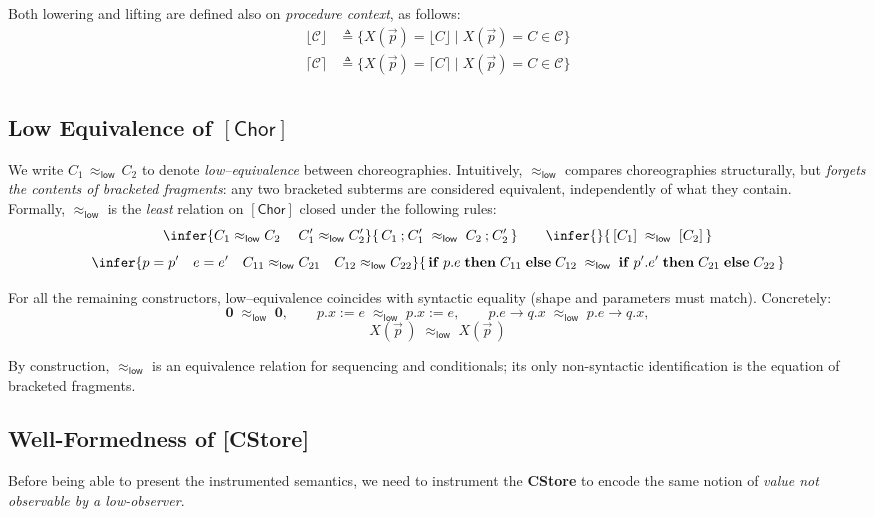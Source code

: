 \documentclass[12pt,a4paper,twoside]{book}
\begin{document}
Both lowering and lifting are defined also on \emph{procedure context}, as follows:
\begin{align*}
	\lfloor \mathscr{C} \rfloor &\triangleq
\{X(\vec{p}) = \lfloor C \rfloor \mid X(\vec{p}) = C \in \mathscr{C}\}\\
	\lceil \mathscr{C} \rceil &\triangleq
\{X(\vec{p}) = \lceil C \rceil \mid X(\vec{p}) = C \in \mathscr{C}\}\\
\end{align*}

\subsection{Low Equivalence of $\mathsf{[Chor]}$}
We write \(C_1 \,\approx_{\mathsf{low}}\, C_2\) to denote \emph{low–equivalence} between choreographies.
Intuitively, \(\approx_{\mathsf{low}}\) compares choreographies structurally, but \emph{forgets the
contents of bracketed fragments}: any two bracketed subterms are considered equivalent,
independently of what they contain.\\
Formally, \(\approx_{\mathsf{low}}\) is the \emph{least} relation on \(\mathsf{[Chor]}\) closed under the following rules:
\[
\infer
  {C_1 \approx_{\mathsf{low}} C_2 \quad\; C_1' \approx_{\mathsf{low}} C_2'}
  {\,C_1 \mathbin{;} C_1' \;\approx_{\mathsf{low}}\; C_2 \mathbin{;} C_2'\,}
\qquad
\infer
  {}
  {\,[C_1] \;\approx_{\mathsf{low}}\; [C_2]\,}
\]
\[
\infer
 {p = p' \quad e = e' \quad C_{11} \approx_{\mathsf{low}} C_{21} \quad C_{12} \approx_{\mathsf{low}} C_{22}}
 {\,\mathbf{if}\; p.e\; \mathbf{then}\; C_{11}\; \mathbf{else}\; C_{12}
   \;\approx_{\mathsf{low}}\;
   \mathbf{if}\; p'.e'\; \mathbf{then}\; C_{21}\; \mathbf{else}\; C_{22}\,}
\]

\noindent For all the remaining constructors, low–equivalence coincides with syntactic equality (shape and parameters must match). Concretely:
\[
\boldsymbol{0} \;\approx_{\mathsf{low}}\; \boldsymbol{0},\qquad
p.x \mathrel{:=} e \;\approx_{\mathsf{low}}\; p.x \mathrel{:=} e,\qquad
p.e \rightarrow q.x \;\approx_{\mathsf{low}}\; p.e \rightarrow q.x,
\]
\[
	X(\vec{p}\,)\;\approx_{\mathsf{low}}\; X(\vec{p}\,)
\]

By construction, \(\approx_{\mathsf{low}}\) is an equivalence relation for sequencing and conditionals; its only non-syntactic identification is the equation of  bracketed fragments.

\subsection{Well-Formedness of \textbf{[CStore]}}
Before being able to present the instrumented semantics, we need to instrument the \textbf{CStore} to encode the same notion of \emph{value not observable by a low-observer}.
\end{document}
